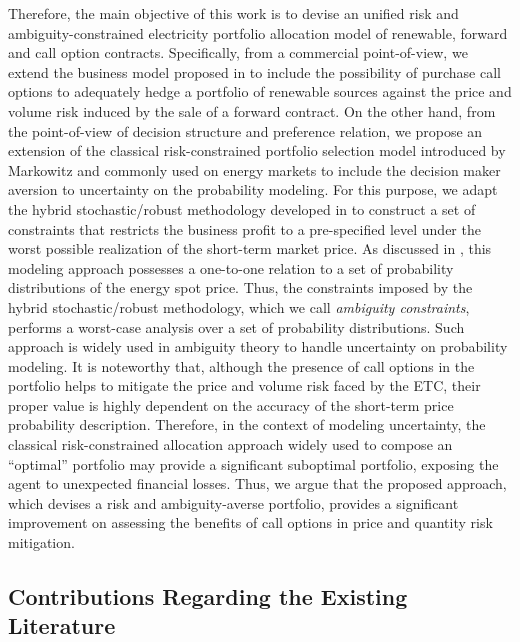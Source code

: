 	Therefore, the main objective of this work is to devise an unified risk and ambiguity-constrained electricity portfolio allocation model of renewable, forward and call option contracts. Specifically, from a commercial point-of-view, we extend the business model proposed in \cite{RobustSpotPrice} to include the possibility of purchase call options to adequately hedge a portfolio of renewable sources against the price and volume risk induced by the sale of a forward contract. On the other hand, from the point-of-view of decision structure and preference relation, we propose an extension of the classical risk-constrained portfolio selection model introduced by Markowitz \cite{PortSelect_Markovitz} and commonly used on energy markets \cite{RiskConstPortSelect} to include the decision maker aversion to uncertainty on the probability modeling. For this purpose, we adapt the hybrid stochastic/robust methodology developed in \cite{RobustSpotPrice, AmbiguityEnergySpotPrice} to construct a set of constraints that restricts the business profit to a pre-specified level under the worst possible realization of the short-term market price. As discussed in \cite{AmbiguityEnergySpotPrice}, this modeling approach possesses a one-to-one relation to a set of probability distributions of the energy spot price. Thus, the constraints imposed by the hybrid stochastic/robust methodology, which we call \textit{ambiguity constraints}, performs a worst-case analysis over a set of probability distributions. Such approach is widely used in ambiguity theory \cite{SoftRobustModel_UnderAmb} to handle uncertainty on probability modeling. It is noteworthy that, although the presence of call options in the portfolio helps to mitigate the price and volume risk faced by the ETC, their proper value is highly dependent on the accuracy of the short-term price probability description. Therefore, in the context of modeling uncertainty, the classical risk-constrained allocation approach widely used to compose an ``optimal'' portfolio may provide a significant suboptimal portfolio, exposing the agent to unexpected financial losses. Thus, we argue that the proposed approach, which devises a risk and ambiguity-averse portfolio, provides a significant improvement on assessing the benefits of call options in price and quantity risk mitigation.

\subsection{Contributions Regarding the Existing Literature}

